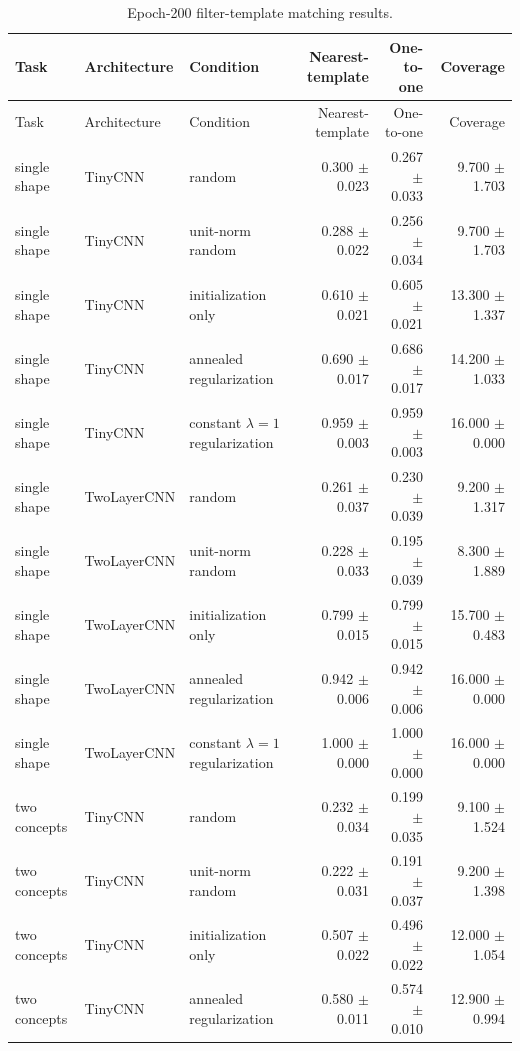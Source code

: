 {\footnotesize
\setlength{\tabcolsep}{2.5pt}
\begin{longtable}{p{.15\linewidth}p{.17\linewidth}p{.20\linewidth}rrr}
\caption{Epoch-200 filter-template matching results.}\label{tab:kernel-matching-full}\\
\toprule
Task & Architecture & Condition & Nearest-template & One-to-one & Coverage \\
\midrule
\endfirsthead
\toprule
Task & Architecture & Condition & Nearest-template & One-to-one & Coverage \\
\midrule
\endhead
\bottomrule
\endfoot
single shape & TinyCNN & random & 0.300 $\pm$ 0.023 & 0.267 $\pm$ 0.033 & 9.700 $\pm$ 1.703 \\
single shape & TinyCNN & unit-norm random & 0.288 $\pm$ 0.022 & 0.256 $\pm$ 0.034 & 9.700 $\pm$ 1.703 \\
single shape & TinyCNN & initialization only & 0.610 $\pm$ 0.021 & 0.605 $\pm$ 0.021 & 13.300 $\pm$ 1.337 \\
single shape & TinyCNN & annealed regularization & 0.690 $\pm$ 0.017 & 0.686 $\pm$ 0.017 & 14.200 $\pm$ 1.033 \\
single shape & TinyCNN & constant $\lambda=1$ regularization & 0.959 $\pm$ 0.003 & 0.959 $\pm$ 0.003 & 16.000 $\pm$ 0.000 \\
\addlinespace[2pt]
single shape & TwoLayerCNN & random & 0.261 $\pm$ 0.037 & 0.230 $\pm$ 0.039 & 9.200 $\pm$ 1.317 \\
single shape & TwoLayerCNN & unit-norm random & 0.228 $\pm$ 0.033 & 0.195 $\pm$ 0.039 & 8.300 $\pm$ 1.889 \\
single shape & TwoLayerCNN & initialization only & 0.799 $\pm$ 0.015 & 0.799 $\pm$ 0.015 & 15.700 $\pm$ 0.483 \\
single shape & TwoLayerCNN & annealed regularization & 0.942 $\pm$ 0.006 & 0.942 $\pm$ 0.006 & 16.000 $\pm$ 0.000 \\
single shape & TwoLayerCNN & constant $\lambda=1$ regularization & 1.000 $\pm$ 0.000 & 1.000 $\pm$ 0.000 & 16.000 $\pm$ 0.000 \\
\addlinespace[2pt]
two concepts & TinyCNN & random & 0.232 $\pm$ 0.034 & 0.199 $\pm$ 0.035 & 9.100 $\pm$ 1.524 \\
two concepts & TinyCNN & unit-norm random & 0.222 $\pm$ 0.031 & 0.191 $\pm$ 0.037 & 9.200 $\pm$ 1.398 \\
two concepts & TinyCNN & initialization only & 0.507 $\pm$ 0.022 & 0.496 $\pm$ 0.022 & 12.000 $\pm$ 1.054 \\
two concepts & TinyCNN & annealed regularization & 0.580 $\pm$ 0.011 & 0.574 $\pm$ 0.010 & 12.900 $\pm$ 0.994 \\

\end{longtable}}
